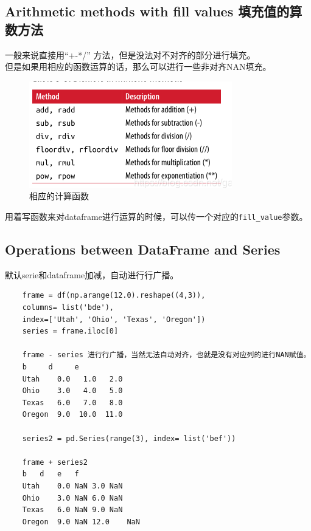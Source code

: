 \documentclass{article}
\begin{document}
\subsection{Arithmetic methods with fill values 填充值的算数方法}
一般来说直接用“+-*/” 方法，但是没法对不对齐的部分进行填充。\\
但是如果用相应的函数运算的话，那么可以进行一些非对齐NAN填充。\\
\begin{figure}[hbtp]
	\centering
	\includegraphics[width=\linewidth]{fig/df5}
	\caption{相应的计算函数}
\end{figure}
用着写函数来对dataframe进行运算的时候，可以传一个对应的\verb|fill_value|参数。

\subsection{Operations between DataFrame and Series}
默认serie和dataframe加减，自动进行行广播。
	
\begin{lstlisting}
	frame = df(np.arange(12.0).reshape((4,3)),
	columns= list('bde'),
	index=['Utah', 'Ohio', 'Texas', 'Oregon'])
	series = frame.iloc[0]
	
	frame - series 进行行广播，当然无法自动对齐，也就是没有对应列的进行NAN赋值。
	b     d     e
	Utah    0.0   1.0   2.0
	Ohio    3.0   4.0   5.0
	Texas   6.0   7.0   8.0
	Oregon  9.0  10.0  11.0
	
	series2 = pd.Series(range(3), index= list('bef'))
	
	frame + series2
	b	d	e	f
	Utah	0.0	NaN	3.0	NaN
	Ohio	3.0	NaN	6.0	NaN
	Texas	6.0	NaN	9.0	NaN
	Oregon	9.0	NaN	12.0	NaN	
\end{lstlisting}
\end{document}
